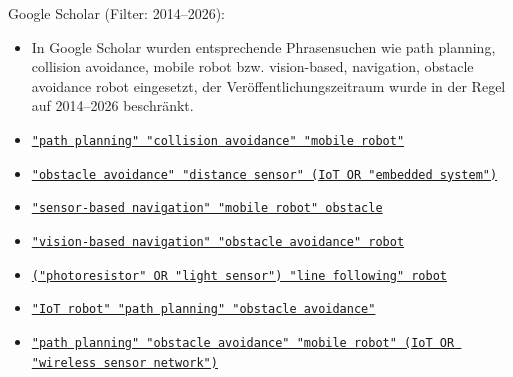 \documentclass[
  a4paper,
  12pt,
  DIV=12,        %
  parskip=half,  %
  headings=small %
]{scrartcl}
\theoremstyle{definition}
\theoremstyle{definition}
\begin{document}
Google Scholar (Filter: 2014--2026):
\begin{itemize}

    \item In Google Scholar wurden entsprechende Phrasensuchen wie
    path planning, collision avoidance, mobile robot bzw.
    vision-based, navigation, obstacle avoidance robot
    eingesetzt, der Veröffentlichungszeitraum wurde in der Regel auf 2014--2026 beschränkt.

    \item \href{https://scholar.google.com/scholar?q=%22path+planning%22+%22collision+avoidance%22+%22mobile+robot%22&hl=de&as_sdt=0%2C5&as_ylo=2014&as_yhi=2026}
    {\texttt{"path planning" "collision avoidance" "mobile robot"}}

    \item \href{https://scholar.google.com/scholar?hl=de&as_sdt=0%2C5&as_ylo=2014&as_yhi=2026&q=%22obstacle+avoidance%22+%22distance+sensor%22+%28IoT+OR+%22embedded+system%22%29&btnG=}
    {\texttt{"obstacle avoidance" "distance sensor" (IoT OR "embedded system")}}

    \item \href{https://scholar.google.com/scholar?hl=de&as_sdt=0%2C5&as_ylo=2014&as_yhi=2026&q=%22sensor-based+navigation%22+%22mobile+robot%22+obstacle&btnG=}
    {\texttt{"sensor-based navigation" "mobile robot" obstacle}}

    \item \href{https://scholar.google.com/scholar?hl=de&as_sdt=0%2C5&as_ylo=2014&as_yhi=2026&q=%22vision-based+navigation%22+%22obstacle+avoidance%22+robot&btnG=}
    {\texttt{"vision-based navigation" "obstacle avoidance" robot}}

    \item \href{https://scholar.google.com/scholar?hl=de&as_sdt=0%2C5&as_ylo=2014&as_yhi=2026&q=%28%22photoresistor%22+OR+%22light+sensor%22%29+%22line+following%22+robot&btnG=}
    {\texttt{("photoresistor" OR "light sensor") "line following" robot}}

    \item \href{https://scholar.google.com/scholar?hl=de&as_sdt=0%2C5&as_ylo=2014&as_yhi=2026&q=%22IoT+robot%22+%22path+planning%22+%22obstacle+avoidance%22&btnG=}
    {\texttt{"IoT robot" "path planning" "obstacle avoidance"}}

    \item \href{https://scholar.google.com/scholar?hl=de&as_sdt=0%2C5&as_ylo=2014&as_yhi=2026&q=%E2%80%9Cpath+planning%E2%80%9D+%E2%80%9Cobstacle+avoidance%E2%80%9D+%E2%80%9Cmobile+robot%E2%80%9D+%28IoT+OR+%E2%80%9Cwireless+sensor+network%E2%80%9D%29&btnG=}
    {\texttt{"path planning" "obstacle avoidance" "mobile robot" (IoT OR "wireless sensor network")}}

\end{itemize}
\end{document}
